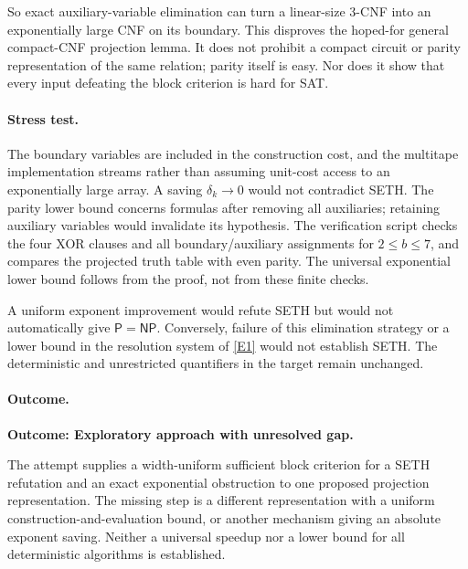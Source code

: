 \documentclass[11pt,a4paper]{article}
\newcommand{\eref}[2]{\hyperlink{extra:#1:#2}{[E#2]}}
\numberwithin{equation}{section}
\begin{document}
So exact auxiliary-variable elimination can turn a linear-size 3-CNF into an exponentially large CNF on its boundary. This disproves the hoped-for general compact-CNF projection lemma. It does not prohibit a compact circuit or parity representation of the same relation; parity itself is easy. Nor does it show that every input defeating the block criterion is hard for SAT.

\paragraph{Stress test.}
The boundary variables are included in the construction cost, and the multitape implementation streams rather than assuming unit-cost access to an exponentially large array. A saving $\delta_k\to0$ would not contradict SETH. The parity lower bound concerns formulas after removing all auxiliaries; retaining auxiliary variables would invalidate its hypothesis. The verification script checks the four XOR clauses and all boundary/auxiliary assignments for $2\le b\le7$, and compares the projected truth table with even parity. The universal exponential lower bound follows from the proof, not from these finite checks.

A uniform exponent improvement would refute SETH but would not automatically give $\mathsf P=\mathsf{NP}$. Conversely, failure of this elimination strategy or a lower bound in the resolution system of \eref{65}{1} would not establish SETH. The deterministic and unrestricted quantifiers in the target remain unchanged.

\paragraph{Outcome.}
\textbf{Outcome: Exploratory approach with unresolved gap.}

The attempt supplies a width-uniform sufficient block criterion for a SETH refutation and an exact exponential obstruction to one proposed projection representation. The missing step is a different representation with a uniform construction-and-evaluation bound, or another mechanism giving an absolute exponent saving. Neither a universal speedup nor a lower bound for all deterministic algorithms is established.

\end{document}
